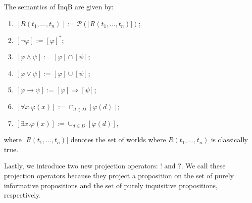 \begin{defi}
 The semantics of \textsf{InqB} are given by:
 \begin{enumerate}\setlength\itemsep{-0.3em}
     \item $[R(t_1,\dots,t_n)] := \mathcal{P}(|R(t_1,\dots,t_n)|)$;
     \item $[\neg \varphi]:=[\varphi]^*$;
     \item $[\varphi\land\psi]:=[\varphi]\cap [\psi]$;
     \item $[\varphi\lor\psi]:=[\varphi]\cup [\psi]$;
     \item $[\varphi\rightarrow\psi]:=[\varphi]\Rightarrow [\psi]$;
     \item $[\forall x . \varphi(x)]:= \cap_{d\in D} [\varphi(d)]$;
     \item $[\exists x . \varphi(x)]:= \cup_{d\in D} [\varphi(d)]$,
 \end{enumerate}
 where $|R(t_1,\dots,t_n)|$ denotes the set of worlds where $R(t_1,\dots,t_n)$ is classically true.
\end{defi}
Lastly, we introduce two new projection operators: $!$ and $?$. We call these projection operators because they project a proposition on the set of purely informative propositions and the set of purely inquisitive propositions, respectively.  


